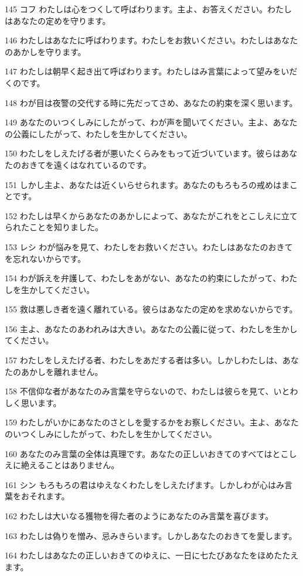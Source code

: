 \par 145 コフ わたしは心をつくして呼ばわります。主よ、お答えください。わたしはあなたの定めを守ります。
\par 146 わたしはあなたに呼ばわります。わたしをお救いください。わたしはあなたのあかしを守ります。
\par 147 わたしは朝早く起き出て呼ばわります。わたしはみ言葉によって望みをいだくのです。
\par 148 わが目は夜警の交代する時に先だってさめ、あなたの約束を深く思います。
\par 149 あなたのいつくしみにしたがって、わが声を聞いてください。主よ、あなたの公義にしたがって、わたしを生かしてください。
\par 150 わたしをしえたげる者が悪いたくらみをもって近づいています。彼らはあなたのおきてを遠くはなれているのです。
\par 151 しかし主よ、あなたは近くいらせられます。あなたのもろもろの戒めはまことです。
\par 152 わたしは早くからあなたのあかしによって、あなたがこれをとこしえに立てられたことを知りました。
\par 153 レシ わが悩みを見て、わたしをお救いください。わたしはあなたのおきてを忘れないからです。
\par 154 わが訴えを弁護して、わたしをあがない、あなたの約束にしたがって、わたしを生かしてください。
\par 155 救は悪しき者を遠く離れている。彼らはあなたの定めを求めないからです。
\par 156 主よ、あなたのあわれみは大きい。あなたの公義に従って、わたしを生かしてください。
\par 157 わたしをしえたげる者、わたしをあだする者は多い。しかしわたしは、あなたのあかしを離れません。
\par 158 不信仰な者があなたのみ言葉を守らないので、わたしは彼らを見て、いとわしく思います。
\par 159 わたしがいかにあなたのさとしを愛するかをお察しください。主よ、あなたのいつくしみにしたがって、わたしを生かしてください。
\par 160 あなたのみ言葉の全体は真理です。あなたの正しいおきてのすべてはとこしえに絶えることはありません。
\par 161 シン もろもろの君はゆえなくわたしをしえたげます。しかしわが心はみ言葉をおそれます。
\par 162 わたしは大いなる獲物を得た者のようにあなたのみ言葉を喜びます。
\par 163 わたしは偽りを憎み、忌みきらいます。しかしあなたのおきてを愛します。
\par 164 わたしはあなたの正しいおきてのゆえに、一日に七たびあなたをほめたたえます。
